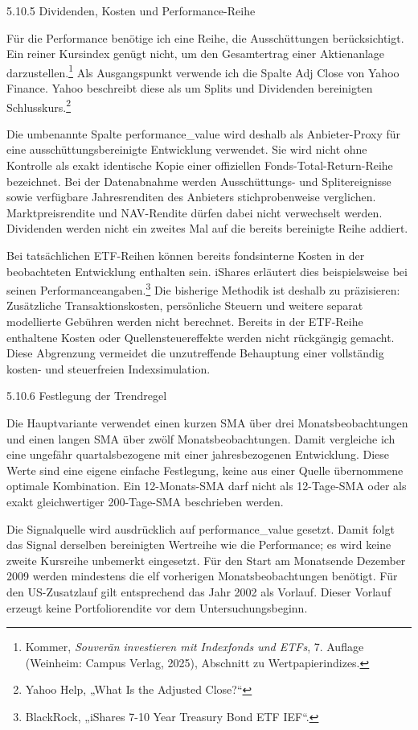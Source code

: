 \documentclass[
  ngerman,
  a4paper,
  DIV=11,
  oneside]{scrreprt}
\begin{document}
5.10.5 Dividenden, Kosten und Performance-Reihe

Für die Performance benötige ich eine Reihe, die Ausschüttungen
berücksichtigt. Ein reiner Kursindex genügt nicht, um den Gesamtertrag
einer Aktienanlage darzustellen.\footnote{Kommer, \emph{Souverän
  investieren mit Indexfonds und ETFs}, 7. Auflage (Weinheim: Campus
  Verlag, 2025), Abschnitt zu Wertpapierindizes.} Als Ausgangspunkt
verwende ich die Spalte Adj Close von Yahoo Finance. Yahoo beschreibt
diese als um Splits und Dividenden bereinigten Schlusskurs.\footnote{Yahoo
  Help, {„What Is the Adjusted Close?``}}

Die umbenannte Spalte performance\_value wird deshalb als Anbieter-Proxy
für eine ausschüttungsbereinigte Entwicklung verwendet. Sie wird nicht
ohne Kontrolle als exakt identische Kopie einer offiziellen
Fonds-Total-Return-Reihe bezeichnet. Bei der Datenabnahme werden
Ausschüttungs- und Splitereignisse sowie verfügbare Jahresrenditen des
Anbieters stichprobenweise verglichen. Marktpreisrendite und NAV-Rendite
dürfen dabei nicht verwechselt werden. Dividenden werden nicht ein
zweites Mal auf die bereits bereinigte Reihe addiert.

Bei tatsächlichen ETF-Reihen können bereits fondsinterne Kosten in der
beobachteten Entwicklung enthalten sein. iShares erläutert dies
beispielsweise bei seinen Performanceangaben.\footnote{BlackRock,
  {„{iShares} 7-10 {Year Treasury Bond ETF} \textbar{} {IEF}``}.} Die
bisherige Methodik ist deshalb zu präzisieren: Zusätzliche
Transaktionskosten, persönliche Steuern und weitere separat modellierte
Gebühren werden nicht berechnet. Bereits in der ETF-Reihe enthaltene
Kosten oder Quellensteuereffekte werden nicht rückgängig gemacht. Diese
Abgrenzung vermeidet die unzutreffende Behauptung einer vollständig
kosten- und steuerfreien Indexsimulation.

5.10.6 Festlegung der Trendregel

Die Hauptvariante verwendet einen kurzen SMA über drei
Monatsbeobachtungen und einen langen SMA über zwölf Monatsbeobachtungen.
Damit vergleiche ich eine ungefähr quartalsbezogene mit einer
jahresbezogenen Entwicklung. Diese Werte sind eine eigene einfache
Festlegung, keine aus einer Quelle übernommene optimale Kombination. Ein
12-Monats-SMA darf nicht als 12-Tage-SMA oder als exakt gleichwertiger
200-Tage-SMA beschrieben werden.

Die Signalquelle wird ausdrücklich auf performance\_value gesetzt. Damit
folgt das Signal derselben bereinigten Wertreihe wie die Performance; es
wird keine zweite Kursreihe unbemerkt eingesetzt. Für den Start am
Monatsende Dezember 2009 werden mindestens die elf vorherigen
Monatsbeobachtungen benötigt. Für den US-Zusatzlauf gilt entsprechend
das Jahr 2002 als Vorlauf. Dieser Vorlauf erzeugt keine Portfoliorendite
vor dem Untersuchungsbeginn.
\end{document}
